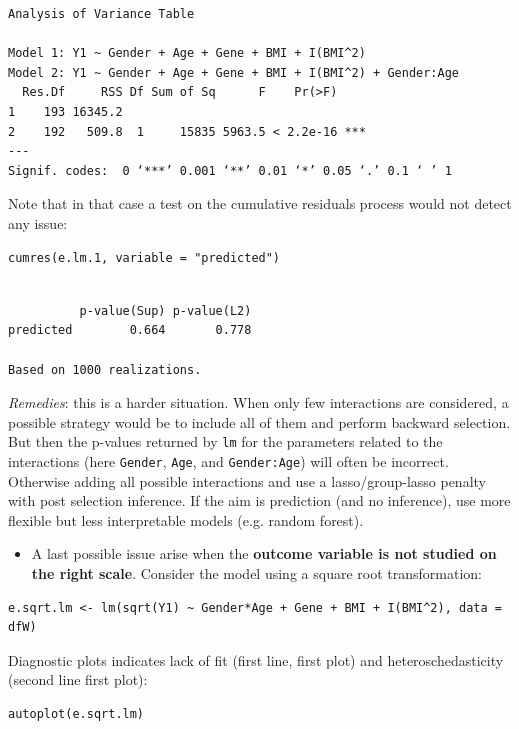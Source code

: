 \documentclass[12pt]{article}
\begin{document}
\begin{verbatim}
Analysis of Variance Table

Model 1: Y1 ~ Gender + Age + Gene + BMI + I(BMI^2)
Model 2: Y1 ~ Gender + Age + Gene + BMI + I(BMI^2) + Gender:Age
  Res.Df     RSS Df Sum of Sq      F    Pr(>F)    
1    193 16345.2                                  
2    192   509.8  1     15835 5963.5 < 2.2e-16 ***
---
Signif. codes:  0 ‘***’ 0.001 ‘**’ 0.01 ‘*’ 0.05 ‘.’ 0.1 ‘ ’ 1
\end{verbatim}
Note that in that case a test on the cumulative residuals process
would not detect any issue:
\lstset{language=r,label= ,caption= ,captionpos=b,numbers=none}
\begin{lstlisting}
cumres(e.lm.1, variable = "predicted")
\end{lstlisting}

\begin{verbatim}

          p-value(Sup) p-value(L2)
predicted        0.664       0.778

Based on 1000 realizations.
\end{verbatim}

\emph{Remedies}: this is a harder situation. When only few interactions are
considered, a possible strategy would be to include all of them and
perform backward selection. But then the p-values returned by \texttt{lm} for
the parameters related to the interactions (here \texttt{Gender}, \texttt{Age}, and
\texttt{Gender:Age}) will often be incorrect. Otherwise adding all possible
interactions and use a lasso/group-lasso penalty with post selection
inference. If the aim is prediction (and no inference), use more
flexible but less interpretable models (e.g. random forest).

\bigskip

\begin{itemize}
\item A last possible issue arise when the \textbf{outcome variable is not
studied on the right scale}. Consider the model using a square root
transformation:
\end{itemize}
\lstset{language=r,label= ,caption= ,captionpos=b,numbers=none}
\begin{lstlisting}
e.sqrt.lm <- lm(sqrt(Y1) ~ Gender*Age + Gene + BMI + I(BMI^2), data = dfW)
\end{lstlisting}

\clearpage

Diagnostic plots indicates lack of fit (first line, first plot) and
heteroschedasticity (second line first plot):
\lstset{language=r,label= ,caption= ,captionpos=b,numbers=none}
\begin{lstlisting}
autoplot(e.sqrt.lm)
\end{lstlisting}
\end{document}
